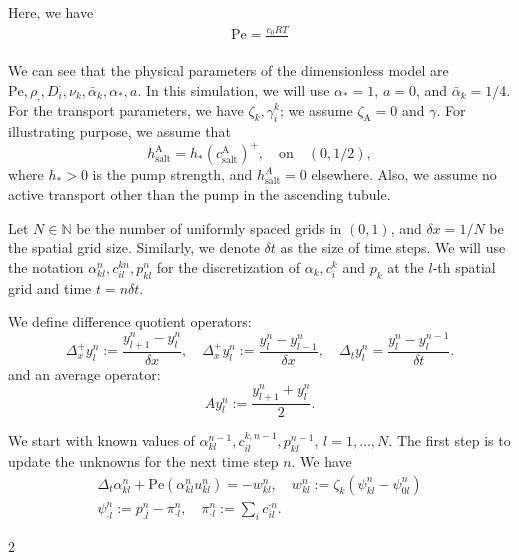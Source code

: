 \documentclass{article}
\begin{document}
    Here, we have
    \begin{gather}
        \mathrm{Pe} = \frac{c_0RT}{}
    \end{gather}

    We can see that the physical parameters of the dimensionless model are $\mathrm{Pe},\rho_\cdot, D_i^\cdot, \nu_k, \bar{\alpha}_k, \alpha_*,a$.
    In this simulation, we will use $\alpha_* = 1$, $a=0$, and $\bar{\alpha}_k = 1/4$.
    For the transport parameters, we have $\zeta_k,\gamma_i^k$; we assume $\zeta_\mathrm{A} = 0$ and $\gamma$.
    For illustrating purpose, we assume that
    \begin{equation}
        h_\mathrm{salt}^\mathrm{A} = h_*(c_\mathrm{salt}^\mathrm{A})^+,\quad \text{on}\quad (0,1/2),
    \end{equation}
        where $h_*>0$ is the pump strength, and $h^A_\mathrm{salt} = 0$ elsewhere.
    Also, we assume no active transport other than the pump in the ascending tubule.

Let $N\in \mathbb{N}$ be the number of uniformly spaced grids in $(0,1)$, and $\delta x = 1/N$ be the spatial grid size.
Similarly, we denote $\delta t$ as the size of time steps.
We will use the notation $\alpha^{n}_{kl},c_{il}^{kn}, p_{kl}^{n}$ for the discretization of $\alpha_k,c_i^k$ and $p_k$ at the $l$-th spatial grid and time $t = n\delta t$.

We define difference quotient operators:
\begin{equation}
    \Delta_x^+y^n_l:= \frac{y^n_{l+1}-y^n_{l}}{\delta x},\quad \Delta_x^+ y^n_l :=\frac{y^n_l-y^n_{l-1}}{\delta x},\quad \Delta_t y^n_l = \frac{y^n_l - y^{n-1}_l}{\delta t}.
\end{equation}
and an average operator:
\begin{equation}
    Ay_l^n := \frac{y^n_{l+1}+y^n_l}{2}.
\end{equation}

We start with known values of $\alpha^{n-1}_{kl},c_{il}^{k,n-1}, p_{kl}^{n-1}$, $l = 1,\dots,N$.
The first step is to update the unknowns for the next time step $n$.
We have
\begin{gather}
    \Delta_t \alpha_{kl}^n +\mathrm{Pe}(\alpha_{kl}^n u_{kl}^n) = -w_{kl}^{n},\quad w_{kl}^n:=\zeta_k\left( \psi_{kl}^n-\psi_{0l}^n \right)\\
    \psi_{\cdot l}^n:= p_{.l}^n - \pi_{\cdot l}^n,\quad \pi_{\cdot l}^n:= \sum_i c_{il}^{\cdot n}.\nonumber
\end{gather}

2
\end{document}
